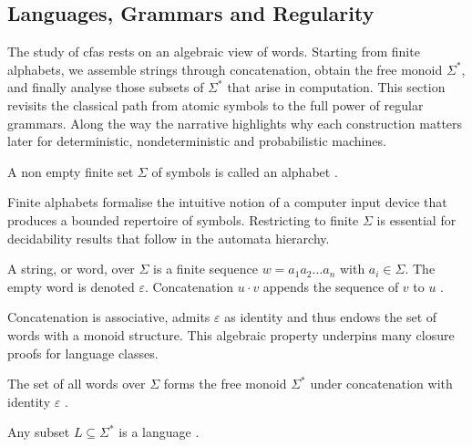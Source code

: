 \subsection{Languages, Grammars and Regularity}\label{subsec:foundations}

The study of \glspl{cfa} rests on an algebraic view of words.  
Starting from finite alphabets, we assemble strings through concatenation,  
obtain the free monoid $\Sigma^{\ast}$,  
and finally analyse those subsets of $\Sigma^{\ast}$ that arise in computation.  
This section revisits the classical path from atomic symbols to the full power of regular grammars.  
Along the way the narrative highlights why each construction matters later for deterministic, nondeterministic and probabilistic machines.  

\begin{definition}[Alphabet]\label{def:alphabet}
A non empty finite set $\Sigma$ of symbols is called an alphabet \cite{hopcroft2001introduction}.  
\end{definition}

Finite alphabets formalise the intuitive notion of a computer input device that produces a bounded repertoire of symbols.  
Restricting to finite $\Sigma$ is essential for decidability results that follow in the automata hierarchy.  

\begin{definition}\label{def:string}
A string, or word, over $\Sigma$ is a finite sequence
$w=a_{1}a_{2}\dots a_{n}$ with $a_{i}\in\Sigma$.  
The empty word is denoted $\varepsilon$.  
Concatenation $u\cdot v$ appends the sequence of $v$ to $u$ \cite{hopcroft2001introduction}.  
\end{definition}

Concatenation is associative, admits $\varepsilon$ as identity and thus endows  
the set of words with a monoid structure.  
This algebraic property underpins many closure proofs for language classes.  

\begin{notation}
The set of all words over $\Sigma$ forms the free monoid
$\Sigma^{\ast}$ under concatenation with identity $\varepsilon$ \cite{hopcroft2001introduction}.  
\end{notation}

\begin{definition}\label{def:language}
Any subset $L\subseteq\Sigma^{\ast}$ is a language \cite{hopcroft2001introduction}.  
\end{definition}

